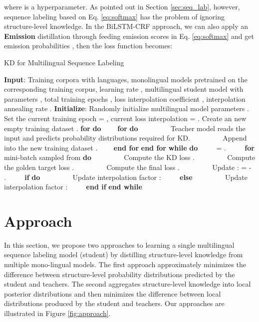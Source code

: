 \documentclass[11pt,a4paper]{article}
\begin{document}
where  is a hyperparameter. As pointed out in Section \ref{sec:seq_lab}, however, sequence labeling based on Eq. \ref{eq:softmax} has the problem of ignoring structure-level knowledge.
In the BiLSTM-CRF approach, we can also apply an \textbf{Emission} distillation through feeding emission scores in Eq. \ref{eq:softmax} and get emission probabilities , then the loss function becomes:




\begin{algorithm}[t]
\small
\caption{KD for Multilingual Sequence Labeling}\label{alg:1}
\begin{algorithmic}[1]
\State \textbf{Input}: Training corpora  with  languages, monolingual models  pretrained on the corresponding training corpus, learning rate , multilingual student model  with parameters , total training epochs , loss interpolation coefficient , interpolation annealing rate . 
\State \textbf{Initialize}: Randomly initialize multilingual model parameters . Set the current training epoch  = , current loss interpolation  = . Create an new empty training dataset .
\State 
\State \textbf{for}  \textbf{do}
\State ~~~~\textbf{for}  \textbf{do}
\State ~~~~~~~~ Teacher model  reads the input  and predicts probability distributions  required for KD.
\State ~~~~~~~~ Append  into the new training dataset .
\State ~~~~\textbf{end for}
\State \textbf{end for}
\State 
\State \textbf{while}  \textbf{do}
\State ~~~~  = .
\State ~~~~ \textbf{for} mini-batch  sampled from  \textbf{do}
\State ~~~~~~~~ Compute the KD loss .
\State ~~~~~~~~ Compute the golden target loss .
\State ~~~~~~~~ Compute the final loss .
\State ~~~~~~~~ Update :  =  -  .
\State ~~~~ \textbf{if}  \textbf{do}
\State ~~~~~~~~ Update interpolation factor :  
\State ~~~~ \textbf{else} 
\State ~~~~~~~~ Update interpolation factor : 
\State ~~~~ \textbf{end if}
\State \textbf{end while}
\end{algorithmic}
\end{algorithm}



\section{Approach}
In this section, we propose two approaches to learning a single multilingual sequence labeling model (student) by distilling structure-level knowledge from multiple mono-lingual models. The first approach approximately minimizes the difference between structure-level probability distributions predicted by the student and teachers. The second aggregates structure-level knowledge into local posterior distributions and then minimizes the difference between local distributions produced by the student and teachers. Our approaches are illustrated in Figure \ref{fig:approach}.
\end{document}

